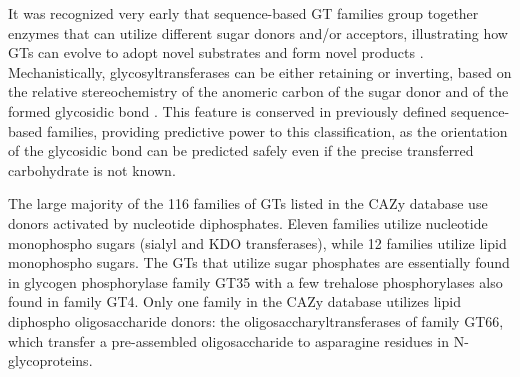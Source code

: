 \documentclass{article}
\begin{document}
It was recognized very early that sequence-based GT families group together enzymes that can utilize different sugar donors and/or acceptors, illustrating how GTs can evolve to adopt novel substrates and form novel products \cite{campbell_classification_1997,coutinho_evolving_2003}. Mechanistically, glycosyltransferases can be either retaining or inverting, based on the relative stereochemistry of the anomeric carbon of the sugar donor and of the formed glycosidic bond \cite{lairson_glycosyltransferases_2008}. This feature is conserved in previously defined sequence-based families, providing predictive power to this classification, as the orientation of the glycosidic bond can be predicted safely even if the precise transferred carbohydrate is not known. 

The large majority of the 116 families of GTs listed in the CAZy database use donors activated by nucleotide diphosphates. Eleven families utilize nucleotide monophospho sugars (sialyl and KDO transferases), while 12 families utilize lipid monophospho sugars. The GTs that utilize sugar phosphates are essentially found in glycogen phosphorylase family GT35 with a few trehalose phosphorylases also found in family GT4. Only one family in the CAZy database utilizes lipid diphospho oligosaccharide donors: the oligosaccharyltransferases of family GT66, which transfer a pre-assembled oligosaccharide to asparagine residues in N-glycoproteins\cite{lairson_glycosyltransferases_2008,knauer_oligosaccharyltransferase_1999}.  
\end{document}
